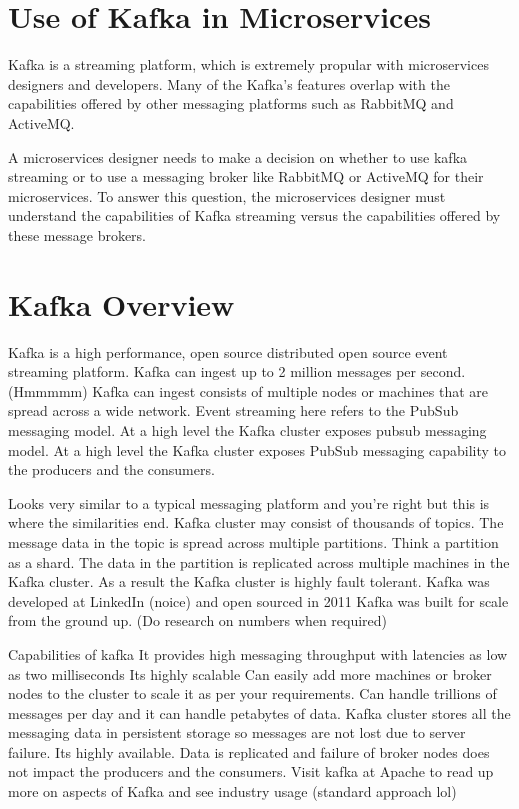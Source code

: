 \section{Use of Kafka in Microservices}

Kafka is a streaming platform, which is extremely propular with microservices designers and developers.
Many of the Kafka's features overlap with the capabilities offered by other messaging platforms such as RabbitMQ and ActiveMQ.

A microservices designer needs to make a decision on whether to use kafka streaming or to use a messaging broker like RabbitMQ or ActiveMQ for their microservices.
To answer this question, the microservices designer must understand the capabilities of Kafka streaming versus the capabilities offered by these message brokers.

\section{Kafka Overview}

Kafka is a high performance, open source distributed open source event streaming platform.
Kafka can ingest up to 2 million messages per second. (Hmmmmm)
Kafka can ingest consists of multiple nodes or machines that are spread across a wide network.
Event streaming here refers to the PubSub messaging model.
At a high level the Kafka cluster exposes pubsub messaging model.
At a high level the Kafka cluster exposes PubSub messaging capability to the producers and the consumers.

Looks very similar to a typical messaging platform and you're right but this is where the similarities end.
Kafka cluster may consist of thousands of topics.
The message data in the topic is spread across multiple partitions.
Think a partition as a shard.
The data in the partition is replicated across multiple machines in the Kafka cluster.
As a result the Kafka cluster is highly fault tolerant.
Kafka was developed at LinkedIn (noice) and open sourced in 2011
Kafka was built for scale from the ground up. (Do research on numbers when required)

Capabilities of kafka
It provides high messaging throughput with latencies as low as two milliseconds
Its highly scalable
Can easily add more machines or broker nodes to the cluster to scale it as per your requirements.
Can handle trillions of messages per day and it can handle petabytes of data.
Kafka cluster stores all the messaging data in persistent storage so messages are not lost due to server failure.
Its highly available.
Data is replicated and failure of broker nodes does not impact the producers and the consumers.
Visit kafka at Apache to read up more on aspects of Kafka and see industry usage (standard approach lol)

